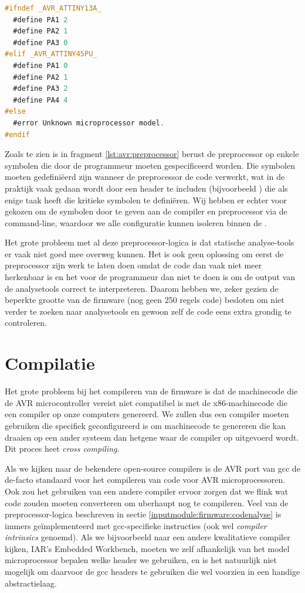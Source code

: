 \begin{lstlisting}[language=C, float, caption=Omzetten van AVR symbolen via preprocessor-logica., label=lst:avr:preprocessor]
#ifndef _AVR_ATTINY13A_
  #define PA1 2
  #define PA2 1
  #define PA3 0
#elif _AVR_ATTINY45PU_
  #define PA1 0
  #define PA2 1
  #define PA3 2
  #define PA4 4
#else
  #error Unknown microprocessor model.
#endif
\end{lstlisting}

Zoals te zien is in fragment \ref{lst:avr:preprocessor} berust de preprocessor op enkele symbolen die door de programmeur moeten gespecificeerd worden. Die symbolen moeten gedefiniëerd zijn wanneer de preprocessor de code verwerkt, wat in de praktijk vaak gedaan wordt door een header te includen (bijvoorbeeld ) die als enige taak heeft die kritieke symbolen te definiëren. Wij hebben er echter voor gekozen om de symbolen door te geven aan de compiler en preprocessor via de command-line, waardoor we alle configuratie kunnen isoleren binnen de .

Het grote probleem met al deze preprocessor-logica is dat statische analyse-tools er vaak niet goed mee overweg kunnen. Het is ook geen oplossing om eerst de preprocessor zijn werk te laten doen omdat de code dan vaak niet meer herkenbaar is en het voor de programmeur dan niet te doen is om de output van de analysetools correct te interpreteren. Daarom hebben we, zeker gezien de beperkte grootte van de firmware (nog geen 250 regels code) besloten om niet verder te zoeken naar analysetools en gewoon zelf de code eens extra grondig te controleren.

\section{Compilatie}

Het grote probleem bij het compileren van de firmware is dat de machinecode die de AVR microcontroller vereist niet compatibel is met de x86-machinecode die een compiler op onze computers genereerd. We zullen dus een compiler moeten gebruiken die specifiek geconfigureerd is om machinecode te genereren die kan draaien op een ander systeem dan hetgene waar de compiler op uitgevoerd wordt. Dit proces heet \emph{cross compiling}.

Als we kijken naar de bekendere open-source compilers is de AVR port van \ac{gcc} de de-facto standaard voor het compileren van code voor AVR microprocessoren. Ook zou het gebruiken van een andere compiler ervoor zorgen dat we flink wat code zouden moeten converteren om uberhaupt nog te compileren. Veel van de preprocessor-logica beschreven in sectie \ref{inputmodule:firmware:codenalyse} is immers geïmplementeerd met \ac{gcc}-specifieke instructies (ook wel \emph{compiler intrinsics} genoemd). Als we bijvoorbeeld naar een andere kwalitatieve compiler kijken, IAR's Embedded Workbench, moeten we zelf afhankelijk van het model microprocessor bepalen welke header we gebruiken, en is het natuurlijk niet mogelijk om daarvoor de \ac{gcc} headers te gebruiken die wel voorzien in een handige abstractielaag.


